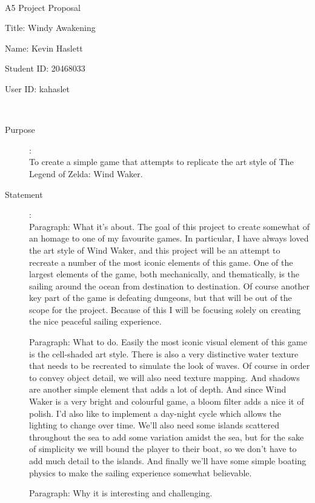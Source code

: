 \documentclass {article}
\begin{document}
~\vfill
\begin{center}
\Large

A5 Project Proposal

Title: Windy Awakening

Name: Kevin Haslett

Student ID: 20468033

User ID: kahaslet
\end{center}
\vfill ~\vfill~
\newpage
{}
\begin{description}
\item[Purpose]:\\
	To create a simple game that attempts to replicate the art style of The Legend of Zelda: Wind Waker.

\item[Statement]:\\

	Paragraph: What it's about.
The goal of this project to create somewhat of an homage to one of my favourite games.  In particular, I have always loved the art style of Wind Waker, and this project will be an attempt to recreate a number of the most iconic elements of this game.  One of the largest elements of the game, both mechanically, and thematically, is the sailing around the ocean from destination to destination.  Of course another key part of the game is defeating dungeons, but that will be out of the scope for the project.  Because of this I will be focusing solely on creating the nice peaceful sailing experience.

	Paragraph: What to do.
Easily the most iconic visual element of this game is the cell-shaded art style. There is also a very distinctive water texture that needs to be recreated to simulate the look of waves.  Of course in order to convey object detail, we will also need texture mapping.  And shadows are another simple element that adds a lot of depth.  And since Wind Waker is a very bright and colourful game, a bloom filter adds a nice it of polish.  I'd also like to implement a day-night cycle which allows the lighting to change over time.  We'll also need some islands scattered throughout the sea to add some variation amidst the sea, but for the sake of simplicity we will bound the player to their boat, so we don't have to add much detail to the islands.  And finally we'll have some simple boating physics to make the sailing experience somewhat believable.

	Paragraph: Why it is interesting and challenging.


\end{description}
\end{document}
